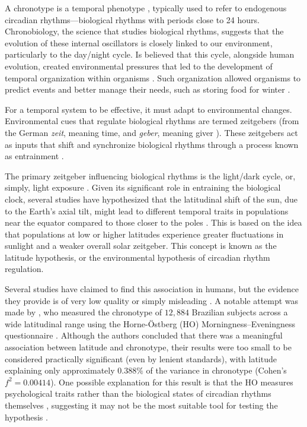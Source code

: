 \documentclass[
12pt,
openright,
oneside,
a4paper,
chapter=TITLE,
section=TITLE,
french,
spanish,
brazil,
english
]{abntex2}
\begin{document}
A chronotype is a temporal phenotype
\autocite{ehret1974a,pittendrigh1993}, typically used to refer to
endogenous circadian rhythms---biological rhythms with periods close to
24 hours. Chronobiology, the science that studies biological rhythms,
suggests that the evolution of these internal oscillators is closely
linked to our environment, particularly to the day/night cycle. Is
believed that this cycle, alongside human evolution, created
environmental pressures that led to the development of temporal
organization within organisms
\autocite{pittendrigh1981,aschoff1989,paranjpe2005}. Such organization
allowed organisms to predict events and better manage their needs, such
as storing food for winter \autocite{aschoff1989a}.

For a temporal system to be effective, it must adapt to environmental
changes. Environmental cues that regulate biological rhythms are termed
zeitgebers (from the German \emph{zeit}, meaning time, and \emph{geber},
meaning giver \autocite{cambridgeuniversitypress}). These zeitgebers act
as inputs that shift and synchronize biological rhythms through a
process known as entrainment \autocite{khalsa2003,minors1991}.

The primary zeitgeber influencing biological rhythms is the light/dark
cycle, or, simply, light exposure
\autocite{aschoff1960,pittendrigh1960,roenneberg2016}. Given its
significant role in entraining the biological clock, several studies
have hypothesized that the latitudinal shift of the sun, due to the
Earth's axial tilt, might lead to different temporal traits in
populations near the equator compared to those closer to the poles
\autocite{bohlen1973,randler2008,leocadio-miguel2014,horzum2015,leocadio-miguel2017}.
This is based on the idea that populations at low or higher latitudes
experience greater fluctuations in sunlight and a weaker overall solar
zeitgeber. This concept is known as the latitude hypothesis, or the
environmental hypothesis of circadian rhythm regulation.

Several studies have claimed to find this association in humans, but the
evidence they provide is of very low quality or simply misleading
\autocites[e.g.,][]{randler2008,leocadio-miguel2014,horzum2015,leocadio-miguel2017,wang2023}.
A notable attempt was made by \textcite{leocadio-miguel2017}, who
measured the chronotype of \(12,884\) Brazilian subjects across a wide
latitudinal range using the Horne-Östberg (HO) Morningness--Eveningness
questionnaire \autocite{horne1976}. Although the authors concluded that
there was a meaningful association between latitude and chronotype,
their results were too small to be considered practically significant
(even by lenient standards), with latitude explaining only approximately
\(0.388\%\) of the variance in chronotype (Cohen's \(f^2 = 0.00414\)).
One possible explanation for this result is that the HO measures
psychological traits rather than the biological states of circadian
rhythms themselves \autocite{roenneberg2019c}, suggesting it may not be
the most suitable tool for testing the hypothesis
\autocite{leocadio-miguel2014}.
\end{document}
